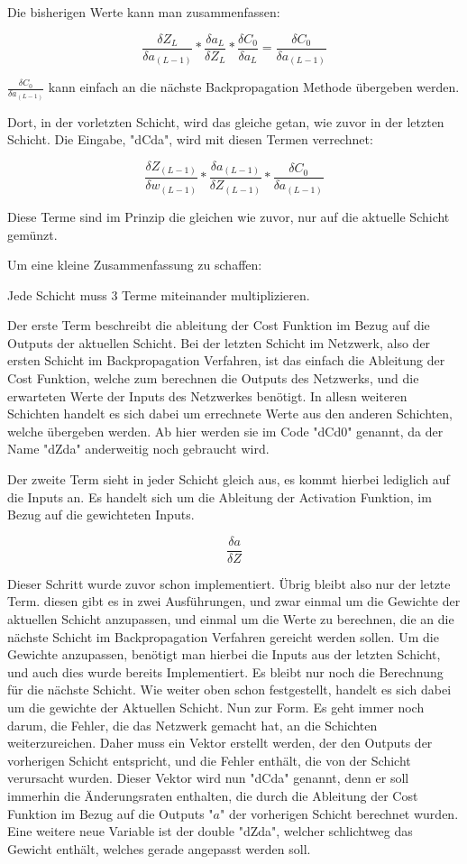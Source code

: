 \documentclass[12pt]{article}
\begin{document}
Die bisherigen Werte kann man zusammenfassen:

$$
\frac{\delta Z_L}{\delta a_{(L-1)}}*
\frac{\delta a_L}{\delta Z_L}*
\frac{\delta C_0}{\delta a_L}
= \frac{\delta C_0}{\delta a_{(L-1)}}
$$

$\frac{\delta C_0}{\delta a_{(L-1)}}$ kann einfach an die nächste Backpropagation Methode übergeben werden.

Dort, in der vorletzten Schicht, wird das gleiche getan, wie zuvor in der letzten Schicht. Die Eingabe, "dCda", wird mit diesen Termen verrechnet:

$$
\frac{\delta Z_{(L-1)}}{\delta w_{(L-1)}}*
\frac{\delta a_{(L-1)}}{\delta Z_{(L-1)}}*
\frac{\delta C_0}{\delta a_{(L-1)}}
$$

Diese Terme sind im Prinzip die gleichen wie zuvor, nur auf die aktuelle Schicht gemünzt. 

Um eine kleine Zusammenfassung zu schaffen:

Jede Schicht muss 3 Terme miteinander multiplizieren. 

Der erste Term beschreibt die ableitung der Cost Funktion im Bezug auf die Outputs der aktuellen Schicht. Bei der letzten Schicht im Netzwerk, also der ersten Schicht im Backpropagation Verfahren, ist das einfach die Ableitung der Cost Funktion, welche zum berechnen die Outputs des Netzwerks, und die erwarteten Werte der Inputs des Netzwerkes benötigt. In allesn weiteren Schichten handelt es sich dabei um errechnete Werte aus den anderen Schichten, welche übergeben werden. Ab hier werden sie im Code "dCd0" genannt, da der Name "dZda" anderweitig noch gebraucht wird.

Der zweite Term sieht in jeder Schicht gleich aus, es kommt hierbei lediglich auf die Inputs an. Es handelt sich um die Ableitung der Activation Funktion, im Bezug auf die gewichteten Inputs.

$$\frac{\delta a}{\delta Z}$$

Dieser Schritt wurde zuvor schon implementiert.
Übrig bleibt also nur der letzte Term. diesen gibt es in zwei Ausführungen, und zwar einmal um die Gewichte der aktuellen Schicht anzupassen, und einmal um die Werte zu berechnen, die an die nächste Schicht im Backpropagation Verfahren gereicht werden sollen.
Um die Gewichte anzupassen, benötigt man hierbei die Inputs aus der letzten Schicht, und auch dies wurde bereits Implementiert. Es bleibt nur noch die Berechnung für die nächste Schicht. Wie weiter oben schon festgestellt, handelt es sich dabei um die gewichte der Aktuellen Schicht. 
Nun zur Form. Es geht immer noch darum, die Fehler, die das Netzwerk gemacht hat, an die Schichten weiterzureichen. Daher muss ein Vektor erstellt werden, der den Outputs der vorherigen Schicht entspricht, und die Fehler enthält, die von der Schicht verursacht wurden.
Dieser Vektor wird nun "dCda" genannt, denn er soll immerhin die Änderungsraten enthalten, die durch die Ableitung der Cost Funktion im Bezug auf die Outputs "$a$" der vorherigen Schicht berechnet wurden. Eine weitere neue Variable ist der double "dZda", welcher schlichtweg das Gewicht enthält, welches gerade angepasst werden soll.
\end{document}
